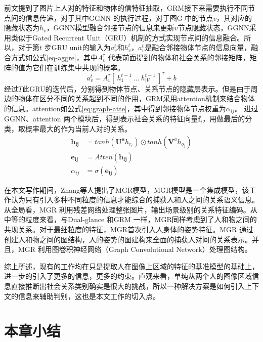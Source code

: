 前文提到了图片上人对的特征和物体的信特征抽取，GRM接下来需要执行不同节点间的信息传递，对于其中GGNN 的执行过程，对于图$\mathrm{G}$ 中的节点$v$，其对应的隐藏状态为$h_{v}$，GGNN模型融合邻接节点的信息来更新$v$节点隐藏状态，GGNN采用类似于Gated Recurrent Unit（GRU）\cite{cho2014learning}机制的方式实现节点间的信息融合。所以，对于第$t$ 步GRU unit的输入为$a_v^t$和$h_v^t$，$a_v^t$是融合邻接物体节点的信息向量，融合方式如公式\ref{eq-aggre}，其中$A_v^{\tau}$ 代表前面提到的物体和社会关系的邻接矩阵，矩阵的值为它们在训练集中共现的概率。
\begin{equation}\label{eq-aggre}
    a_v^t = A_{v}^{\tau}[~h_1^{t-1}~...~h_{|V|}^{t-1}~]^{\tau} + b
\end{equation}
经过$T$此GRU的迭代后，分别得到物体节点、关系节点的隐藏层表示。但是由于周边的物体在区分不同的关系起到不同的作用，GRM采用attention机制来结合物体的信息。attention如公式\ref{eq:graph-atte}，其中得到邻接物体节点权重为$\alpha_{ij}$。 进过GGNN、attention 两个模块后，得到表示社会关系的特征向量$\mathbf{f}_{i}$，用做最后的分类，取概率最大的作为当前人对的关系。
\begin{equation}\label{eq:graph-atte}
    \begin{split}
        \mathbf{h_{ij}} &= tanh(\mathbf{U^a}h_{r_{i}}) \odot tanh(\mathbf{V}^ah_{o_{j}}) \\
        \mathbf{e_{ij}} &= Atten(\mathbf{h_{ij}}) \\
        \alpha_{ij} &= \sigma(\mathbf{e_{ij}})
    \end{split}
\end{equation}

在本文写作期间，Zhang等人\cite{zhang2019multi}提出了MGR模型，MGR模型是一个集成模型，该工作认为只有引入多种不同粒度的信息才能综合的捕获人和人之间的关系语义信息。从全局看，MGR 利用残差网络处理整张图片，输出场景级别的关系特征编码。从中等的粒度来看，与Dual-glance 和GRM 一样，MGR同样考虑到了人和物之间的共现关系。对于最细粒度的特征，MGR首次引入人身体的姿势特征。MGR 通过创建人和物之间的图结构，人的姿势的图建构来全面的捕获人对间的关系表示。并且，MGR 利用图卷积神经网络（Graph Convolutional Network）\cite{kipf2016semi}处理图结构。


综上所述，现有的工作均在只是提取人在图像上区域的特征的基准模型的基础上，进一步的引入了更多的信息，更多的约束。直观来看，单纯从两个人的图像区域信息直接推断出社会关系类别确实是很大的挑战，所以一种解决方案是如何引入上下文的信息来辅助判别，这也是本文工作的切入点。

\section{本章小结}

